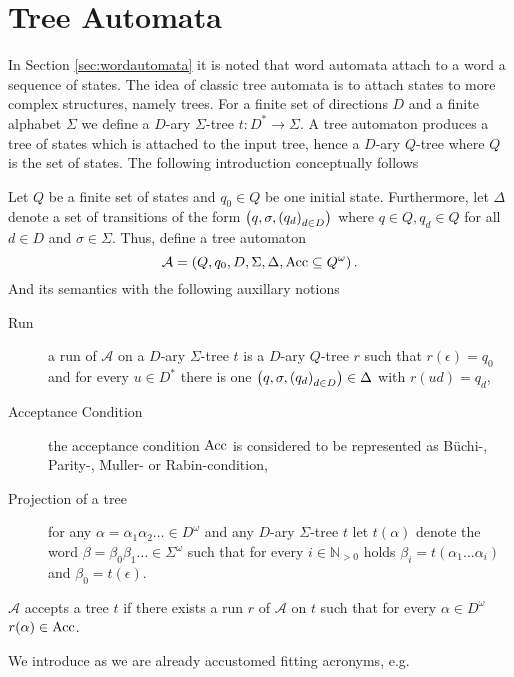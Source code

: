 \section{Tree Automata}
In Section \ref{sec:wordautomata} it is noted that word automata attach to a
word a sequence of states. The idea of classic tree automata is to attach
states to more complex structures, namely trees. For a finite set of
directions $D$ and a finite alphabet $\Sigma$ we define a $D$-ary $\Sigma$-tree
$t:D^{*}\rightarrow\Sigma$. A tree automaton produces a tree of states
which is attached to the input tree, hence a $D$-ary $Q$-tree where $Q$ is the
set of states. The following introduction conceptually follows 
\cite[Chapter 8]{AutoLogInfGames}
\begin{definition}
  Let $Q$ be a finite set of states and $q_{0}\in Q$ be one initial state.
  Furthermore, let $\Delta$ denote a set of transitions of the form
  $\left(q,\sigma, \left(q_{d}\right)_{d\in D}\right)$ where $q\in Q, q_{d}\in Q$ for
  all $d\in D$ and $\sigma\in\Sigma$. Thus, define a tree automaton
  \begin{equation*}
    \mathcal{A} = \left(Q, q_{0}, D, \Sigma, \Delta, \operatorname{Acc}\subseteq Q^{\omega}\right).
  \end{equation*}
  And its semantics with the following auxillary notions
  \begin{description}
    \item[Run] a run of $\mathcal{A}$ on a $D$-ary $\Sigma$-tree $t$ is a
      $D$-ary $Q$-tree $r$ such that $r(\epsilon) = q_{0}$ and for every 
      $u\in D^{*}$ there is one 
      $\left(q,\sigma, \left(q_{d}\right)_{d\in D}\right)\in\Delta$ with $r(ud) = q_{d}$,
    \item[Acceptance Condition] the acceptance condition $\operatorname{Acc}$ is considered
      to be represented as Büchi-, Parity-, Muller- or Rabin-condition,
    \item[Projection of a tree] for any $\alpha=\alpha_{1}\alpha_{2}\dots\in
      D^{\omega}$ and any $D$-ary $\Sigma$-tree $t$ let $t(\alpha)$ denote the 
      word $\beta = \beta_{0}\beta_{1}\dots\in\Sigma^{\omega}$ such that for 
      every $i\in\mathbb{N}_{>0}$ holds 
      $\beta_{i} = t(\alpha_{1}\dots\alpha_{i})$ and $\beta_{0} = t(\epsilon)$.
  \end{description}
  $\mathcal{A}$ accepts a tree $t$ if there exists a run $r$ of $\mathcal{A}$
  on $t$ such that for every $\alpha\in D^{\omega}$ $r(\alpha)\in\operatorname{Acc}$.
\end{definition}
We introduce as we are already accustomed fitting acronyms, e.g.
